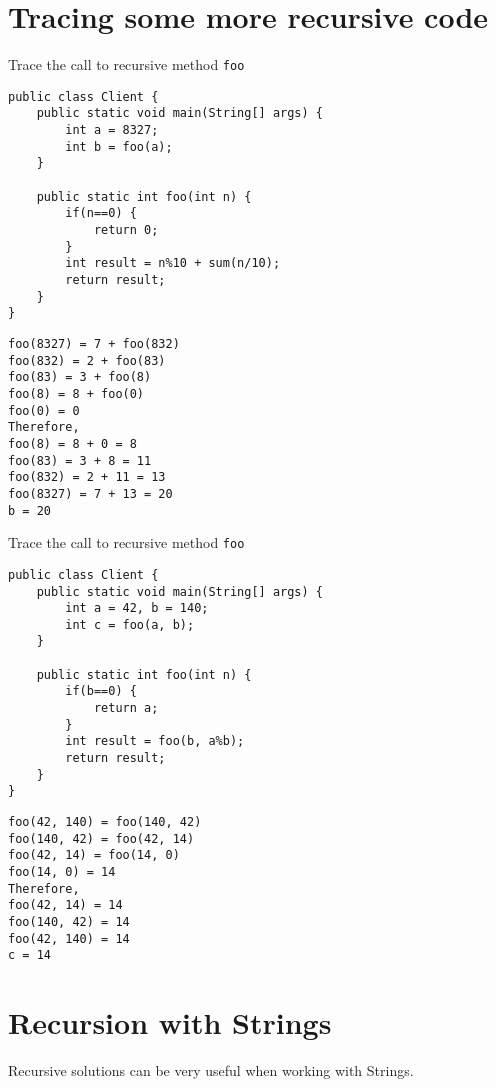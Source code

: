 \newpage
\section{Tracing some more recursive code}

\begin{exercise}[6]
Trace the call to recursive method \texttt{foo}

\begin{lstlisting}
public class Client {
	public static void main(String[] args) {
		int a = 8327;
		int b = foo(a);
	}
	
	public static int foo(int n) {
		if(n==0) {
			return 0;
		}
		int result = n%10 + sum(n/10);
		return result;
	}
}
\end{lstlisting}
\end{exercise}
\begin{answer}
\begin{verbatim}
foo(8327) = 7 + foo(832)
foo(832) = 2 + foo(83)
foo(83) = 3 + foo(8)
foo(8) = 8 + foo(0)
foo(0) = 0
Therefore,
foo(8) = 8 + 0 = 8
foo(83) = 3 + 8 = 11
foo(832) = 2 + 11 = 13
foo(8327) = 7 + 13 = 20
b = 20	
\end{verbatim}
\end{answer}

\newpage

\begin{exercise}[6]
Trace the call to recursive method \texttt{foo}

\begin{lstlisting}
public class Client {
	public static void main(String[] args) {
		int a = 42, b = 140;
		int c = foo(a, b);
	}
	
	public static int foo(int n) {
		if(b==0) {
			return a;
		}
		int result = foo(b, a%b);
		return result;
	}
}
\end{lstlisting}
\end{exercise}
\begin{answer}
\begin{verbatim}
foo(42, 140) = foo(140, 42)
foo(140, 42) = foo(42, 14)
foo(42, 14) = foo(14, 0)
foo(14, 0) = 14
Therefore,
foo(42, 14) = 14
foo(140, 42) = 14
foo(42, 140) = 14
c = 14
\end{verbatim}
\end{answer}

\section{Recursion with Strings}

Recursive solutions can be very useful when working with Strings.

